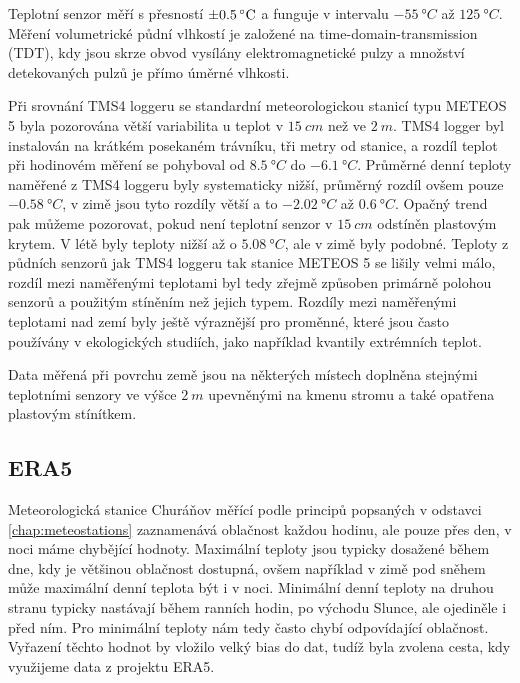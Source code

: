 Teplotní senzor měří s přesností $\SI{\pm 0.5}{\degree C}$ a funguje v intervalu $\SI{-55}{\degree C}$ až $\SI{125}{\degree C}$. Měření volumetrické půdní vlhkostí je založené na time-domain-transmission (TDT), kdy jsou skrze obvod vysílány elektromagnetické pulzy a množství detekovaných pulzů je přímo úměrné vlhkosti. 

Při srovnání TMS4 loggeru se standardní meteorologickou stanicí typu METEOS 5 byla pozorována větší variabilita u teplot v $\SI{15}{cm}$ než ve $\SI{2}{m}$. TMS4 logger byl instalován na krátkém posekaném trávníku, tři metry od stanice, a rozdíl teplot při hodinovém měření se pohyboval od $\SI{+8.5}{\degree C}$ do $\SI{-6.1}{\degree C}$. Průměrné denní teploty naměřené z TMS4 loggeru byly systematicky nižší, průměrný rozdíl ovšem pouze $\SI{-0.58}{\degree C}$, v zimě jsou tyto rozdíly větší a to $\SI{-2.02}{\degree C}$ až $\SI{0.6}{\degree C}$. Opačný trend pak můžeme pozorovat, pokud není teplotní senzor v $\SI{15}{cm}$ odstíněn plastovým krytem. V létě byly teploty nižší až o $\SI{5.08}{\degree C}$, ale v zimě byly podobné. Teploty z půdních senzorů jak TMS4 loggeru tak stanice METEOS 5 se lišily velmi málo, rozdíl mezi naměřenými teplotami byl tedy zřejmě způsoben primárně polohou senzorů a použitým stíněním než jejich typem. Rozdíly mezi naměřenými teplotami nad zemí byly ještě výraznější pro proměnné, které jsou často používány v ekologických studiích, jako například kvantily extrémních teplot\cite{WildJan2019Caer}. 

Data měřená při povrchu země jsou na některých místech doplněna stejnými teplotními senzory ve výšce $\SI{2}{m}$ upevněnými na kmenu stromu a také opatřena plastovým stínítkem.

\subsection{ERA5}\label{chap:era5}
Meteorologická stanice Churáňov měřící podle principů popsaných v odstavci \ref{chap:meteostations} zaznamenává oblačnost každou hodinu, ale pouze přes den, v noci máme chybějící hodnoty. Maximální teploty jsou typicky dosažené během dne, kdy je většinou oblačnost dostupná, ovšem například v zimě pod sněhem může maximální denní teplota být i v noci. Minimální denní teploty na druhou stranu typicky nastávají během ranních hodin, po východu Slunce, ale ojediněle i před ním. Pro minimální teploty nám tedy často chybí odpovídající oblačnost. Vyřazení těchto hodnot by vložilo velký bias do dat, tudíž byla zvolena cesta, kdy využijeme data z projektu ERA5.

